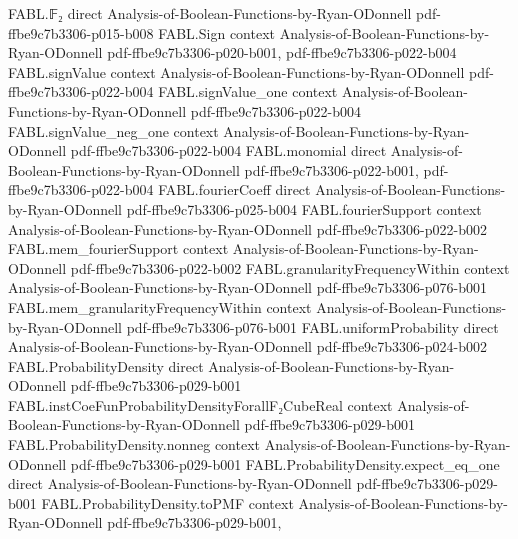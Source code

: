 \begin{theorem}
\leanok
{}
\proofstep
  {FABL.𝔽₂}
  {direct}
  {Analysis-of-Boolean-Functions-by-Ryan-ODonnell}
  {pdf-ffbe9c7b3306-p015-b008}
\proofstep
  {FABL.Sign}
  {context}
  {Analysis-of-Boolean-Functions-by-Ryan-ODonnell}
  {pdf-ffbe9c7b3306-p020-b001,
    pdf-ffbe9c7b3306-p022-b004}
\proofstep
  {FABL.signValue}
  {context}
  {Analysis-of-Boolean-Functions-by-Ryan-ODonnell}
  {pdf-ffbe9c7b3306-p022-b004}
\proofstep
  {FABL.signValue_one}
  {context}
  {Analysis-of-Boolean-Functions-by-Ryan-ODonnell}
  {pdf-ffbe9c7b3306-p022-b004}
\proofstep
  {FABL.signValue_neg_one}
  {context}
  {Analysis-of-Boolean-Functions-by-Ryan-ODonnell}
  {pdf-ffbe9c7b3306-p022-b004}
\proofstep
  {FABL.monomial}
  {direct}
  {Analysis-of-Boolean-Functions-by-Ryan-ODonnell}
  {pdf-ffbe9c7b3306-p022-b001,
    pdf-ffbe9c7b3306-p022-b004}
\proofstep
  {FABL.fourierCoeff}
  {direct}
  {Analysis-of-Boolean-Functions-by-Ryan-ODonnell}
  {pdf-ffbe9c7b3306-p025-b004}
\proofstep
  {FABL.fourierSupport}
  {context}
  {Analysis-of-Boolean-Functions-by-Ryan-ODonnell}
  {pdf-ffbe9c7b3306-p022-b002}
\proofstep
  {FABL.mem_fourierSupport}
  {context}
  {Analysis-of-Boolean-Functions-by-Ryan-ODonnell}
  {pdf-ffbe9c7b3306-p022-b002}
\proofstep
  {FABL.granularityFrequencyWithin}
  {context}
  {Analysis-of-Boolean-Functions-by-Ryan-ODonnell}
  {pdf-ffbe9c7b3306-p076-b001}
\proofstep
  {FABL.mem_granularityFrequencyWithin}
  {context}
  {Analysis-of-Boolean-Functions-by-Ryan-ODonnell}
  {pdf-ffbe9c7b3306-p076-b001}
\proofstep
  {FABL.uniformProbability}
  {direct}
  {Analysis-of-Boolean-Functions-by-Ryan-ODonnell}
  {pdf-ffbe9c7b3306-p024-b002}
\proofstep
  {FABL.ProbabilityDensity}
  {direct}
  {Analysis-of-Boolean-Functions-by-Ryan-ODonnell}
  {pdf-ffbe9c7b3306-p029-b001}
\proofstep
  {FABL.instCoeFunProbabilityDensityForallF₂CubeReal}
  {context}
  {Analysis-of-Boolean-Functions-by-Ryan-ODonnell}
  {pdf-ffbe9c7b3306-p029-b001}
\proofstep
  {FABL.ProbabilityDensity.nonneg}
  {context}
  {Analysis-of-Boolean-Functions-by-Ryan-ODonnell}
  {pdf-ffbe9c7b3306-p029-b001}
\proofstep
  {FABL.ProbabilityDensity.expect_eq_one}
  {direct}
  {Analysis-of-Boolean-Functions-by-Ryan-ODonnell}
  {pdf-ffbe9c7b3306-p029-b001}
\proofstep
  {FABL.ProbabilityDensity.toPMF}
  {context}
  {Analysis-of-Boolean-Functions-by-Ryan-ODonnell}
  {pdf-ffbe9c7b3306-p029-b001,
}
\end{theorem}
